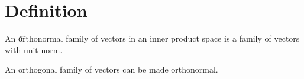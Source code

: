 

\section*{Definition}

An \t{orthonormal family of vectors} in an inner product space is a family of vectors with unit norm.

\begin{proposition}
An orthogonal family of vectors can be made orthonormal.
\end{proposition}

\blankpage